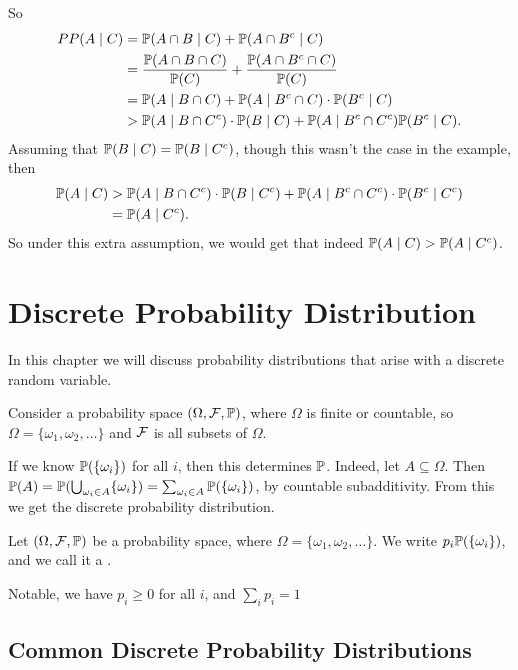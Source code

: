 \documentclass[a4paper]{scrreprt}
\begin{document}
\begin{example}
	So
	\begin{align*}
		PP(A \mid C) &= \mathbb{P}(A \cap B \mid C) + \mathbb{P}(A \cap B^c \mid C) \\
		&= \frac{\mathbb{P}(A \cap B \cap C)}{\mathbb{P}(C)} + \frac{\mathbb{P}(A \cap B^c \cap C)}{\mathbb{P}(C)} \\
		&= \mathbb{P}(A \mid B \cap C) + \mathbb{P}(A \mid B^c \cap C) \cdot \mathbb{P}(B^c \mid C) \\
		&> \mathbb{P}(A \mid B \cap C^c) \cdot \mathbb{P}(B \mid C) + \mathbb{P}(A \mid B^c \cap C^c) \mathbb{P}(B^c \mid C).
	\end{align*}
	Assuming that $\mathbb{P}(B \mid C) = \mathbb{P}(B \mid C^c)$, though this wasn't the case in the example, then
	\begin{align*}
		\mathbb{P}(A \mid C) &> \mathbb{P}(A \mid B \cap C^c) \cdot \mathbb{P}(B \mid C^c) + \mathbb{P}(A \mid B^c \cap C^c) \cdot \mathbb{P}(B^c \mid C^c) \\
		&= \mathbb{P}(A \mid C^c).
	\end{align*}
	So under this extra assumption, we would get that indeed $\mathbb{P}(A \mid C) > \mathbb{P}(A \mid C^c)$.
\end{example}

\chapter{Discrete Probability Distribution}

In this chapter we will discuss probability distributions that arise
with a discrete random variable. 

Consider a probability space $(\Omega, \mathcal{F}, \mathbb{P})$, where $\Omega$ is finite or countable, so $\Omega = \{\omega_1, \omega_2, \dots \}$ and $\mathcal{F}$ is all subsets of $\Omega$.

If we know $\mathbb{P}(\{\omega_i\})$ for all $i$, then this determines $\mathbb{P}$. Indeed, let $A \subseteq \Omega$. Then $\mathbb{P}(A) = \mathbb{P}(\bigcup_{\omega_i \in A } \{\omega_i \}) = \sum_{\omega_i \in A} \mathbb{P}(\{\omega_i\})$, by countable subadditivity.
From this we get the discrete probability distribution.

\begin{definition}
	Let $(\Omega, \mathcal{F}, \mathbb{P})$ be a probability space, where $\Omega = \{\omega_1, \omega_2, \dots \}$. 
	We write $p_i \mathbb{P}(\{\omega_i\})$, and we call it a .
\end{definition}

Notable, we have $p_i \geq 0$ for all $i$, and $\sum_i p_i = 1$


\section{Common Discrete Probability Distributions}
\end{document}
